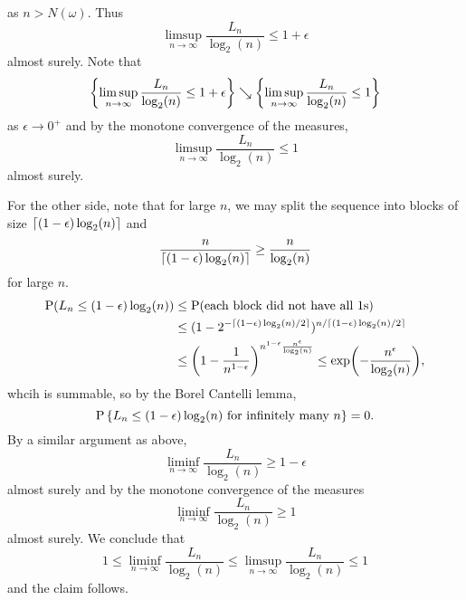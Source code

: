 \begin{example}
\begin{equation*}
    \end{equation*}
    as $n > N(\omega)$. Thus
    \begin{equation*}
        \limsup_{n\to\infty} \frac{L_n}{\log_2(n)}\leq 1+\epsilon
    \end{equation*}
    almost surely. Note that 
    \begin{equation*}
        \left\{ {\limsup_{n\to\infty}\frac{L_n}{\log_2(n)}\leq 1+\epsilon} \right\} 
        \searrow 
        \left\{ {\limsup_{n\to\infty}\frac{L_n}{\log_2(n)}\leq 1} \right\}
    \end{equation*}
    as $\epsilon\to 0^+$ and by the monotone convergence of the measures, 
    \begin{equation*}
        \limsup_{n\to\infty} \frac{L_n}{\log_2(n)}\leq 1
    \end{equation*}
    almost surely. 

    For the other side, note that for large $n$, we may split the sequence into 
    blocks of size $\ceil{(1-\epsilon)\log_2(n)}$ and 
    \begin{equation*}
        \frac{n}{\ceil{(1-\epsilon)\log_2(n)}} \geq \frac{n}{\log_2(n)}
    \end{equation*}
    for large $n$. 
    \begin{equation*}
        \begin{split}
            \P(L_n\leq (1-\epsilon)\log_2(n)) &\leq \P(\text{each block did not have all 1s}) \\
            &\leq (1-2^{-\ceil{(1-\epsilon)\log_2(n)/2}})^{n/\ceil{(1-\epsilon)\log_2(n)/2}} \\ 
            &\leq \pth{1 - \frac{1}{n^{1-\epsilon}}}^{n^{1-\epsilon}\frac{n^\epsilon}{\log_2(n)}} 
            \leq \exp\pth{-\frac{n^\epsilon}{\log_2(n)}},
        \end{split}
    \end{equation*}
    whcih is summable, so by the Borel Cantelli lemma, 
    \begin{equation*}
        \operatorname{P}\left\{ {L_n\leq (1-\epsilon)\log_2(n)\text{ for infinitely many $n$}} \right\} = 0.
    \end{equation*}
    By a similar argument as above, 
    \begin{equation*}
        \liminf_{n\to\infty} \frac{L_n}{\log_2(n)} \geq 1-\epsilon
    \end{equation*}
    almost surely and by the monotone convergence of the measures 
    \begin{equation*}
        \liminf_{n\to\infty} \frac{L_n}{\log_2(n)} \geq 1
    \end{equation*}
    almost surely. We conclude that 
    \begin{equation*}
        1 \leq \liminf_{n\to\infty} \frac{L_n}{\log_2(n)} 
        \leq \limsup_{n\to\infty} \frac{L_n}{\log_2(n)}\leq 1
    \end{equation*}
    and the claim follows. 
\end{example}

